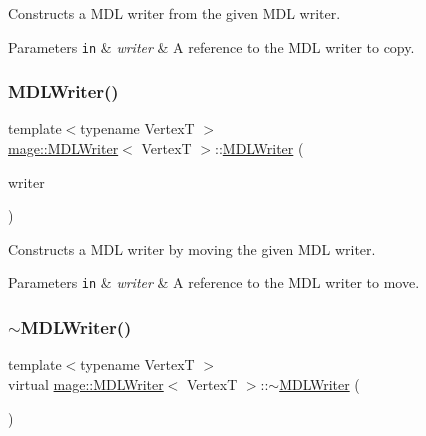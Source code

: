 Constructs a M\+DL writer from the given M\+DL writer.


\begin{DoxyParams}[1]{Parameters}
\mbox{\tt in}  & {\em writer} & A reference to the M\+DL writer to copy. \\
\hline
\end{DoxyParams}
\hypertarget{classmage_1_1_m_d_l_writer_a6eedabcade544cc08747535ad36323c4}{}\label{classmage_1_1_m_d_l_writer_a6eedabcade544cc08747535ad36323c4} 
\subsubsection{\texorpdfstring{M\+D\+L\+Writer()}{MDLWriter()}\hspace{0.1cm}{\footnotesize\ttfamily [3/3]}}
{\footnotesize\ttfamily template$<$typename VertexT $>$ \\
\hyperlink{classmage_1_1_m_d_l_writer}{mage\+::\+M\+D\+L\+Writer}$<$ VertexT $>$\+::\hyperlink{classmage_1_1_m_d_l_writer}{M\+D\+L\+Writer} (\begin{DoxyParamCaption}\item[{\hyperlink{classmage_1_1_m_d_l_writer}{M\+D\+L\+Writer}$<$ VertexT $>$ \&\&}]{writer }\end{DoxyParamCaption})}

Constructs a M\+DL writer by moving the given M\+DL writer.


\begin{DoxyParams}[1]{Parameters}
\mbox{\tt in}  & {\em writer} & A reference to the M\+DL writer to move. \\
\hline
\end{DoxyParams}
\hypertarget{classmage_1_1_m_d_l_writer_a8ec899d031d513eedf3345b78361d0de}{}\label{classmage_1_1_m_d_l_writer_a8ec899d031d513eedf3345b78361d0de} 
\subsubsection{\texorpdfstring{$\sim$\+M\+D\+L\+Writer()}{~MDLWriter()}}
{\footnotesize\ttfamily template$<$typename VertexT $>$ \\
virtual \hyperlink{classmage_1_1_m_d_l_writer}{mage\+::\+M\+D\+L\+Writer}$<$ VertexT $>$\+::$\sim$\hyperlink{classmage_1_1_m_d_l_writer}{M\+D\+L\+Writer} (\begin{DoxyParamCaption}{ }\end{DoxyParamCaption})\hspace{0.3cm}{\ttfamily [virtual]}}

